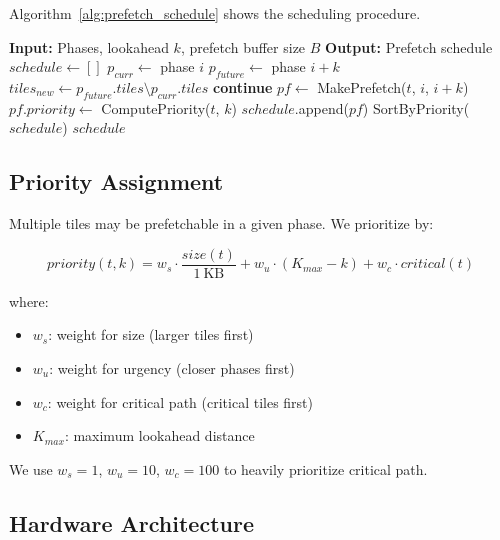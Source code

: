 \documentclass[journal]{IEEEtran}
\begin{document}
Algorithm~\ref{alg:prefetch_schedule} shows the scheduling procedure.

\begin{algorithm}[t]
\caption{Prefetch Scheduling}
\label{alg:prefetch_schedule}
\begin{algorithmic}[1]
\STATE \textbf{Input:} Phases, lookahead $k$, prefetch buffer size $B$
\STATE \textbf{Output:} Prefetch schedule
\STATE $schedule \gets []$
  \STATE $p_{curr} \gets $ phase $i$
  \STATE $p_{future} \gets $ phase $i + k$
  \STATE $tiles_{new} \gets p_{future}.tiles \setminus p_{curr}.tiles$
  \STATE {}
      \STATE \textbf{continue}  
    \ENDIF
      \STATE $pf \gets $ MakePrefetch($t$, $i$, $i+k$)
      \STATE $pf.priority \gets $ ComputePriority($t$, $k$)
      \STATE $schedule$.append($pf$)
    \ENDIF
  \ENDFOR
\ENDFOR
\STATE SortByPriority($schedule$)
\RETURN $schedule$
\end{algorithmic}
\end{algorithm}

\subsection{Priority Assignment}

Multiple tiles may be prefetchable in a given phase. We prioritize by:

\begin{equation}
priority(t, k) = w_s \cdot \frac{size(t)}{1~\text{KB}} + w_u \cdot (K_{max} - k) + w_c \cdot critical(t)
\end{equation}

where:
\begin{itemize}
\item $w_s$: weight for size (larger tiles first)
\item $w_u$: weight for urgency (closer phases first)
\item $w_c$: weight for critical path (critical tiles first)
\item $K_{max}$: maximum lookahead distance
\end{itemize}

We use $w_s = 1$, $w_u = 10$, $w_c = 100$ to heavily prioritize critical path.

\subsection{Hardware Architecture}
\end{document}
